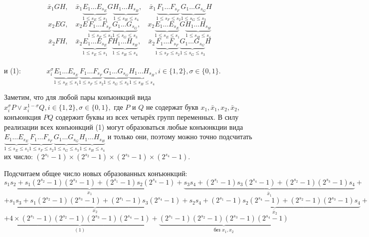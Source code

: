 \documentclass[12pt,a4paper,oneside,fleqn,leqno]{article}
\theoremstyle{definition}
\begin{document}
			$$
				\bar{x}_1GH, \quad \bar{x}_1\underbrace{E_1\ldots E_{s_E}}_{1 \leqslant s_E \leqslant s_1}G\underbrace{H_1\ldots H_{s_H}}_{1 \leqslant s_H \leqslant s_4}, \quad 
\bar{x}_1\underbrace{F_1\ldots F_{s_F}}_{1 \leqslant s_F \leqslant s_2}\underbrace{G_1\ldots G_{s_G}}_{1 \leqslant s_G \leqslant s_3}H
			$$
			$$
				x_2EG, \quad x_2E\underbrace{F_1\ldots F_{s_F}}_{1 \leqslant s_F \leqslant s_2}\underbrace{G_1\ldots G_{s_G}}_{1 \leqslant s_G \leqslant s_3}, \quad x_2\underbrace{E_1\ldots E_{s_E}}_{1 \leqslant s_E \leqslant s_1}G\underbrace{H_1\ldots H_{s_H}}_{1 \leqslant s_H \leqslant s_4}
			$$
			$$
				\bar{x}_2FH, \quad \bar{x}_2\underbrace{E_1\ldots E_{s_E}}_{1 \leqslant s_E \leqslant s_1}F\underbrace{H_1\ldots H_{s_H}}_{1 \leqslant s_H \leqslant s_4}, \quad \bar{x}_2\underbrace{F_1\ldots F_{s_F}}_{1 \leqslant s_F \leqslant s_2}\underbrace{G_1\ldots G_{s_G}}_{1 \leqslant s_G \leqslant s_3}H
			$$\\
			и (1): $\qquad\quad\,\, x_i^{\sigma} \underbrace{E_1\ldots E_{s_E}}_{1\leqslant s_E \leqslant s_1}\underbrace{F_1\ldots F_{s_F}}_{1\leqslant s_F \leqslant s_2}\underbrace{G_1\ldots G_{s_G}}_{1\leqslant s_G \leqslant s_3}\underbrace{H_1\ldots H_{s_H}}_{1\leqslant s_H \leqslant s_4}, i\in\{1,2\},\sigma\in\{0,1\}$.\par
			Заметим, что для любой пары конъюнкций вида $x_i^{\sigma}P \vee x_i^{1 - \sigma}Q, i\in\{1, 2\},\sigma\in\{0,1\},$ где $P$ и $Q$ не содержат букв $x_1, \bar{x}_1, x_2, \bar{x}_2,$ конъюнкция $PQ$ содержит буквы из всех четырёх групп переменных. В силу реализации всех конъюнкций (1) могут образоваться любые конъюнкции вида $\underbrace{E_1\ldots E_{s_E}}_{1\leqslant s_E \leqslant s_1}\underbrace{F_1\ldots F_{s_F}}_{1\leqslant s_F \leqslant s_2}\underbrace{G_1\ldots G_{s_G}}_{1\leqslant s_G \leqslant s_3}\underbrace{H_1\ldots H_{s_H}}_{1\leqslant s_H \leqslant s_4}$ и только они, поэтому можно точно подсчитать их число: $(2^{s_1} - 1) \times (2^{s_2} - 1) \times(2^{s_3} - 1) \times (2^{s_4} - 1).$\par
			Подсчитаем общее число новых образованных конъюнкций:
			$$
				\underbrace{s_1s_2 + s_1(2^{s_2} - 1)(2^{s_3} - 1) + (2^{s_1} - 1)s_2(2^{s_4} - 1)}_{x_1} + \underbrace{s_3s_4 + (2^{s_1} - 1)s_3(2^{s_4} - 1) + (2^{s_2} - 1)(2^{s_3} - 1)s_4}_{\bar{x}_1} +$$
			$$+ \underbrace{s_1s_3 + s_1(2^{s_2} - 1)(2^{s_3} - 1) + (2^{s_1} - 1)s_3(2^{s_4} - 1)}_{x_2} + \underbrace{s_2s_4 + (2^{s_1} - 1)s_2(2^{s_4} - 1) + (2^{s_2} - 1)(2^{s_3} - 1)s_4}_{\bar{x}_2} +$$
			$$+ \underbrace{4\times(2^{s_1} - 1)  (2^{s_2} - 1) (2^{s_3} - 1)  (2^{s_4} - 1)}_{(1)} + \underbrace{(2^{s_1} - 1)  (2^{s_2} - 1) (2^{s_3} - 1)  (2^{s_4} - 1)}_{\text{без } x_1, x_2}$$\par
\end{document}
